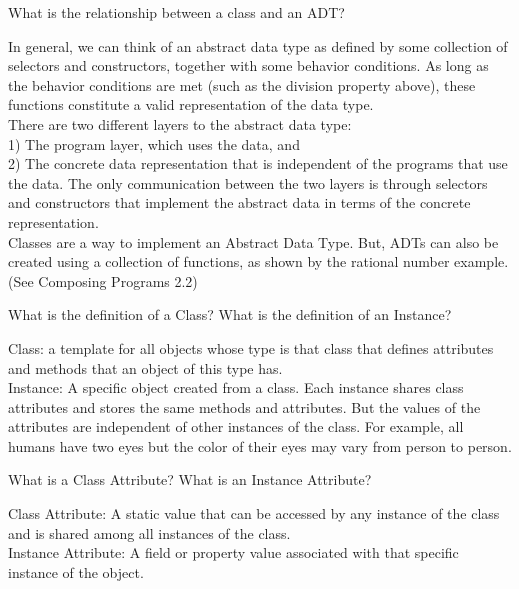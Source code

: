 \question
What is the relationship between a class and an ADT?

\begin{solution}[1in]
In general, we can think of an abstract data type as defined by some collection of selectors and constructors, together with some behavior conditions. As long as the behavior conditions are met (such as the division property above), these functions constitute a valid representation of the data type. \\

There are two different layers to the abstract data type:  \\

1) The program layer, which uses the data, and\\
2) The concrete data representation that is independent of the programs that use the data. The only communication between the two layers is through selectors and constructors that implement the abstract data in terms of the concrete representation. \\

Classes are a way to implement an Abstract Data Type. But, ADTs can also be created using a collection of functions, as shown by the rational number example. (See Composing Programs 2.2)\\
\end{solution}

\question
What is the definition of a Class? What is the definition of an Instance?

\begin{solution}[0.5in]
Class: a template for all objects whose type is that class that defines attributes and methods that an object of this type has. \\
Instance: A specific object created from a class. Each instance shares class attributes and stores the same methods and attributes. But the values of the attributes are independent of other instances of the class. For example, all humans have two eyes but the color of their eyes may vary from person to person. \\
\end{solution}

\question
What is a Class Attribute? What is an Instance Attribute?

\begin{solution}[0.5in]
Class Attribute: A static value that can be accessed by any instance of the class
and is shared among all instances of the class.\\
Instance Attribute: A field or property value associated with that specific instance of the object.\\
\end{solution}


